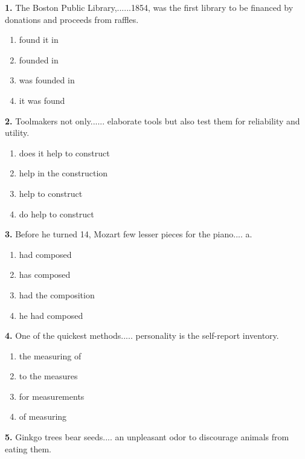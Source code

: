 \documentclass[12pt]{article}
\begin{document}
\noindent\textbf{1.} The Boston Public Library,......1854, was the first library to be financed by donations and proceeds from raffles.
\begin{enumerate}[label=(\Alph*),leftmargin=*,itemsep=0.2em]
\item found it in
\item founded in
\item was founded in
\item it was found
\end{enumerate}
\par
\vspace{0.25\baselineskip}
\noindent\textbf{2.} Toolmakers not only...... elaborate tools but also test them for reliability and utility.
\begin{enumerate}[label=(\Alph*),leftmargin=*,itemsep=0.2em]
\item does it help to construct
\item help in the construction
\item help to construct
\item do help to construct
\end{enumerate}
\par
\vspace{0.25\baselineskip}
\noindent\textbf{3.} Before he turned 14, Mozart few lesser pieces for the piano.... a.
\begin{enumerate}[label=(\Alph*),leftmargin=*,itemsep=0.2em]
\item had composed
\item has composed
\item had the composition
\item he had composed
\end{enumerate}
\par
\vspace{0.25\baselineskip}
\noindent\textbf{4.} One of the quickest methods..... personality is the self-report inventory.
\begin{enumerate}[label=(\Alph*),leftmargin=*,itemsep=0.2em]
\item the measuring of
\item to the measures
\item for measurements
\item of measuring
\end{enumerate}
\par
\vspace{0.25\baselineskip}
\noindent\textbf{5.} Ginkgo trees bear seeds.... an unpleasant odor to discourage animals from eating them.
\end{document}
